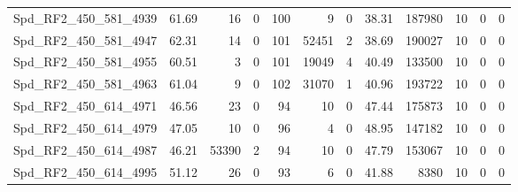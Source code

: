 \begin{longtable}[c]{@{}lrrrrrrrrrrr@{}}
Spd\_RF2\_450\_581\_4939      & 61.69                  & 16                      & 0                       & 100                    & 9                       & 0                       & 38.31                   & 187980                   & 10                       & 0                        & 0                        \\
Spd\_RF2\_450\_581\_4947      & 62.31                  & 14                      & 0                       & 101                    & 52451                   & 2                       & 38.69                   & 190027                   & 10                       & 0                        & 0                        \\
Spd\_RF2\_450\_581\_4955      & 60.51                  & 3                       & 0                       & 101                    & 19049                   & 4                       & 40.49                   & 133500                   & 10                       & 0                        & 0                        \\
Spd\_RF2\_450\_581\_4963      & 61.04                  & 9                       & 0                       & 102                    & 31070                   & 1                       & 40.96                   & 193722                   & 10                       & 0                        & 0                        \\
Spd\_RF2\_450\_614\_4971      & 46.56                  & 23                      & 0                       & 94                     & 10                      & 0                       & 47.44                   & 175873                   & 10                       & 0                        & 0                        \\
Spd\_RF2\_450\_614\_4979      & 47.05                  & 10                      & 0                       & 96                     & 4                       & 0                       & 48.95                   & 147182                   & 10                       & 0                        & 0                        \\
Spd\_RF2\_450\_614\_4987      & 46.21                  & 53390                   & 2                       & 94                     & 10                      & 0                       & 47.79                   & 153067                   & 10                       & 0                        & 0                        \\
Spd\_RF2\_450\_614\_4995      & 51.12                  & 26                      & 0                       & 93                     & 6                       & 0                       & 41.88                   & 8380                     & 10                       & 0                        & 0                        \\

\end{longtable}
